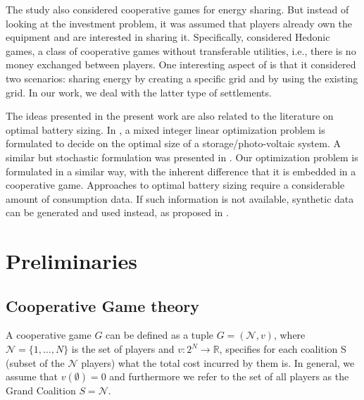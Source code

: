 \documentclass[sigconf, table]{acmart}
\newcommand{\N}{\mathcal{N}}
\begin{document}
The study \cite{hedonic} also considered cooperative games for energy sharing. But instead of looking at the investment problem, it was assumed that players already own the equipment and are interested in sharing it. 
Specifically,  \cite{hedonic} considered Hedonic games, a class of cooperative games without transferable utilities, i.e., there is no money exchanged between players. One interesting aspect of \cite{hedonic} is that it considered two scenarios: sharing energy by creating a specific grid and by using the existing grid. In our work, we deal with the latter type of settlements.

The ideas presented in the present work are also related to the literature on optimal battery sizing. In \cite{KHALILPOUR2016194}, a mixed integer linear optimization problem is formulated to decide on the optimal size of a storage/photo-voltaic system. A similar but stochastic formulation was presented in \cite{CERVANTES2018105}. 
Our optimization problem is formulated in a similar way, with the inherent difference that it is embedded in a cooperative game.
Approaches to optimal battery sizing require a considerable amount of consumption data. If such information is not available, synthetic data can be generated and used instead, as proposed in \cite{synthetictraces}.

\section{Preliminaries}

\subsection{Cooperative Game theory}

A cooperative game $G$ can be defined as a tuple $G = (\N, v)$, where $\N = \{1, \dots, N\}$ is the set of players and $v \colon 2^N \to \mathbb{R}$, specifies for each coalition S (subset of the $\N$ players) what the total cost incurred by them is.
In general, we assume that $v(\emptyset) = 0$ and furthermore we refer to the set of all players as the Grand Coalition $S = \N$.
\end{document}
